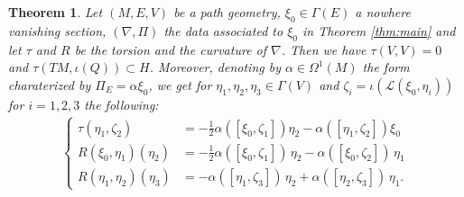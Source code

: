 \documentclass[10pt,a4paper]{amsart}
\newtheorem{theorem}{Theorem}
\begin{document}
\begin{theorem}\label{tors-curv}
  Let $(M,E,V)$ be a path geometry, $\xi_0\in\Gamma(E)$ a nowhere vanishing section, $(\nabla,\Pi)$ the data associated to $\xi_0$ in Theorem \ref{thm:main} and let $\tau$ and $R$ be the torsion and the curvature of $\nabla$. Then we have $\tau(V,V)=0$ and $\tau(TM,\iota(Q))\subset H$. Moreover, denoting by $\alpha\in\Omega^1(M)$ the form charaterized by $\Pi_E=\alpha\xi_0$, we get for $\eta_1,\eta_2,\eta_3\in\Gamma(V)$ and $\zeta_i=\iota(\mathcal L(\xi_0,\eta_i))$ for $i=1,2,3$ the following:
\begin{equation}\label{eq:tors-curv}
\begin{aligned}
\begin{cases}
\tau(\eta_1,\zeta_2)&=-\tfrac12\alpha([\xi_0,\zeta_1])\eta_2-\alpha([\eta_1,\zeta_2])\xi_0\\ 
R(\xi_0,\eta_1)(\eta_2)&=-\tfrac12\alpha([\xi_0,\zeta_1])\,\eta_2-\alpha([\xi_0,\zeta_2])\,\eta_1\\
R(\eta_1,\eta_2)(\eta_3)&=-\alpha([\eta_1,\zeta_3])\,\eta_2+\alpha([\eta_2,\zeta_3])\,\eta_1.
\end{cases}
\end{aligned}
\end{equation}  
\end{theorem}
\end{document}

